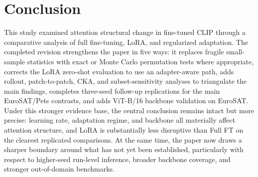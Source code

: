 \documentclass[10pt]{article}
\begin{document}
\section{Conclusion}
This study examined attention structural change in fine-tuned CLIP through a comparative analysis of full fine-tuning, LoRA, and regularized adaptation. The completed revision strengthens the paper in five ways: it replaces fragile small-sample statistics with exact or Monte Carlo permutation tests where appropriate, corrects the LoRA zero-shot evaluation to use an adapter-aware path, adds rollout, patch-to-patch, CKA, and subset-sensitivity analyses to triangulate the main findings, completes three-seed follow-up replications for the main EuroSAT/Pets contrasts, and adds ViT-B/16 backbone validation on EuroSAT. Under this stronger evidence base, the central conclusion remains intact but more precise: learning rate, adaptation regime, and backbone all materially affect attention structure, and LoRA is substantially less disruptive than Full FT on the clearest replicated comparisons. At the same time, the paper now draws a sharper boundary around what has not yet been established, particularly with respect to higher-seed run-level inference, broader backbone coverage, and stronger out-of-domain benchmarks.



\end{document}
